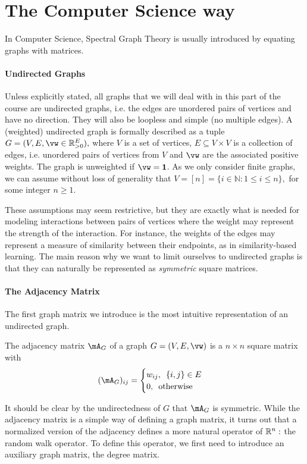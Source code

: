\section{The Computer Science way}

In Computer Science, Spectral Graph Theory is usually introduced by equating graphs with matrices\cite{chungSpectralGraphTheory,spielmanSpectralGraphTheory2007}. 

\paragraph{Undirected Graphs}
Unless explicitly stated, all graphs that we will deal with in this part of the course are undirected graphs, i.e. the edges are unordered pairs of vertices and have no direction. They will also be loopless and simple (no multiple edges).
%
A (weighted) undirected graph is formally described as a tuple $G = (V, E, \vw \in \R_{>0}^E),$ where $V$ is a set of vertices, $E \subseteq V \times V$ is a collection of edges, i.e. unordered pairs of vertices from $V$ and $\vw$ are the associated positive weights.
%
The graph is unweighted if  $\vw = \mathbf{1}$.
%
As we only consider finite graphs, we can assume without loss of generality that $V = [n] = \{i \in \mathbb{N}: 1 \leq i \leq n\},$ for some integer $n \geq 1.$
%

These assumptions may seem restrictive, but they are exactly what is needed for modeling interactions between pairs of vertices where the weight may represent the strength of the interaction. For instance, the weights of the edges may represent a measure of similarity between their endpoints, as in similarity-based learning.
%
The main reason why we want to limit ourselves to undirected graphs is that they can naturally be represented as {\it symmetric} square matrices. 

\paragraph{The Adjacency Matrix} The first graph matrix we introduce is the most intuitive representation of an undirected graph.
\begin{definition}
The adjacency matrix $\mA_G$ of a graph $G=(V,E, \vw)$ is a $n \times n$ square matrix with
$$
(\mA_G)_ {ij} = 
							\begin{cases}
							w_{ij}, \enspace \{i,j\} \in E \\
							0,       \enspace \textrm{otherwise}
							\end{cases}
$$
\end{definition}
It should be clear by the undirectedness of $G$ that $\mA_G$ is symmetric.
%
While the adjacency matrix is a simple way of defining a graph matrix, it turns out that a normalized version of the adjacency defines a more natural operator of $\mathbb{R}^n:$ the random walk operator. To define this operator, we first need to introduce an auxiliary graph matrix, the degree matrix.

